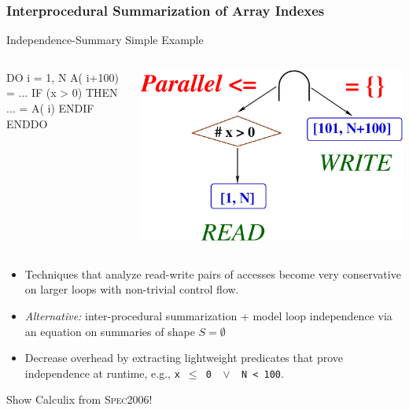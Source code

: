 \documentclass{beamer}
\newcommand{\emp}[1]{\textcolor{DikuRed}{ #1}}
\begin{document}
\begin{frame}[fragile,t]
  \frametitle{Interprocedural Summarization of Array Indexes}


\begin{block}{ Independence-Summary Simple Example } \vspace{-1ex}
\begin{columns} 
\begin{colorcode}[fontsize=\scriptsize]
DO i = 1, N
  A(\emp{i+100}) = ...
  IF (x > 0) THEN
    ... = A(\emp{i})
  ENDIF
ENDDO
\end{colorcode}
\begin{center} \hspace{-4ex}
\includegraphics[height=15ex]{Figures/L5-LoopPar/SimpleInd}
\end{center}
\end{columns}
\end{block}


        \begin{itemize}
            \item Techniques that analyze read-write pairs of accesses become
                    very conservative on larger loops with non-trivial control flow.\smallskip   
            \item {\em Alternative:} inter-procedural summarization + model loop independence 
                    via an equation on summaries of shape $S = \emptyset$\\\smallskip 
            \item Decrease overhead by extracting lightweight predicates that prove 
                    independence at runtime, e.g., {\tt x~$\leq$~0~~$\vee$~~N~<~100}.
        \end{itemize} 

\bigskip

\alert{Show Calculix from \textsc{Spec2006}}!

\end{frame}
\end{document}
